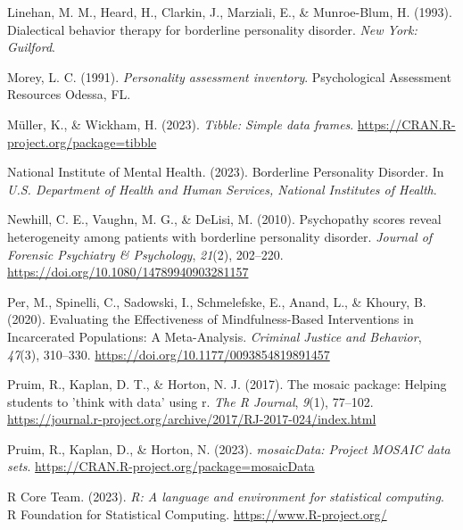 \documentclass[
  man,floatsintext]{apa7}
\newlength{\cslhangindent}
\newlength{\cslentryspacingunit} %
\newenvironment{CSLReferences}[2] %
 {%
  \setlength{\parindent}{0pt}
  \ifodd #1
  \let\oldpar\par
  \def\par{\hangindent=\cslhangindent\oldpar}
  \fi
  \setlength{\parskip}{#2\cslentryspacingunit}
 }%
 {}
\begin{document}
\begin{CSLReferences}{1}{0}
\leavevmode{}%
Linehan, M. M., Heard, H., Clarkin, J., Marziali, E., \& Munroe-Blum, H. (1993). Dialectical behavior therapy for borderline personality disorder. \emph{New York: Guilford}.

\leavevmode{}%
Morey, L. C. (1991). \emph{Personality assessment inventory}. Psychological Assessment Resources Odessa, FL.

\leavevmode{}%
Müller, K., \& Wickham, H. (2023). \emph{Tibble: Simple data frames}. \url{https://CRAN.R-project.org/package=tibble}

\leavevmode{}%
National Institute of Mental Health. (2023). Borderline {Personality Disorder}. In \emph{U.S. Department of Health and Human Services, National Institutes of Health}.

\leavevmode{}%
Newhill, C. E., Vaughn, M. G., \& DeLisi, M. (2010). Psychopathy scores reveal heterogeneity among patients with borderline personality disorder. \emph{Journal of Forensic Psychiatry \& Psychology}, \emph{21}(2), 202--220. \url{https://doi.org/10.1080/14789940903281157}

\leavevmode{}%
Per, M., Spinelli, C., Sadowski, I., Schmelefske, E., Anand, L., \& Khoury, B. (2020). Evaluating the {Effectiveness} of {Mindfulness-Based Interventions} in {Incarcerated Populations}: {A Meta-Analysis}. \emph{Criminal Justice and Behavior}, \emph{47}(3), 310--330. \url{https://doi.org/10.1177/0093854819891457}

\leavevmode{}%
Pruim, R., Kaplan, D. T., \& Horton, N. J. (2017). The mosaic package: Helping students to 'think with data' using r. \emph{The R Journal}, \emph{9}(1), 77--102. \url{https://journal.r-project.org/archive/2017/RJ-2017-024/index.html}

\leavevmode{}%
Pruim, R., Kaplan, D., \& Horton, N. (2023). \emph{mosaicData: Project MOSAIC data sets}. \url{https://CRAN.R-project.org/package=mosaicData}

\leavevmode{}%
R Core Team. (2023). \emph{R: A language and environment for statistical computing}. R Foundation for Statistical Computing. \url{https://www.R-project.org/}


\end{CSLReferences}
\end{document}
